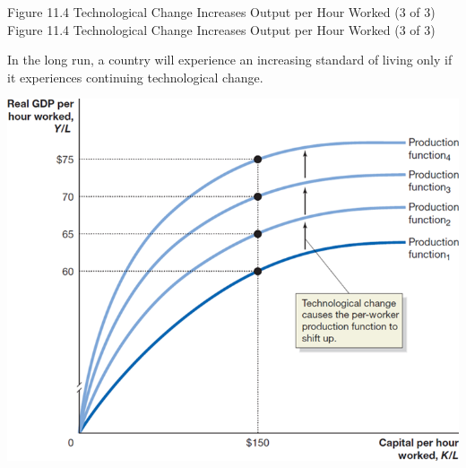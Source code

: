 \documentclass[
  12pt,
  ignorenonframetext,
]{beamer}
\begin{document}
\begin{frame}{Figure 11.4 Technological Change Increases Output per Hour
Worked (3 of 3)}
\protect\hypertarget{figure-11.4-technological-change-increases-output-per-hour-worked-3-of-3}{}
Figure 11.4 Technological Change Increases Output per Hour Worked (3 of
3)

In the long run, a country will experience an increasing standard of
living only if it experiences continuing technological change.

\includegraphics[width=\textwidth,height=0.99\textheight]{imgs3/img_slide22a.png}
\end{frame}
\end{document}
